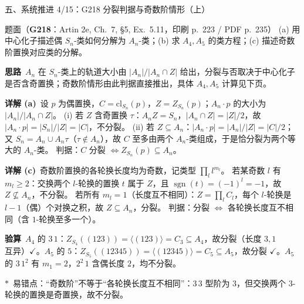 \documentclass[aspectratio=169,10pt,fontset=none]{ctexbeamer}
\newcommand{\ex}[1]{\textcolor{accent}{\footnotesize\bfseries #1}}
\newcommand{\key}[1]{\textcolor{ink}{\bfseries #1}}
\newcommand{\starpt}{\textcolor{accent}{\bfseries$\ast$}}
\begin{document}
\begin{frame}[t]{五、系统推进 4/15：G218 分裂判据与奇数阶情形（上）}
\label{ex:G218}
\scriptsize
\begin{block}{\footnotesize 题面（\ex{G218}：Artin 2e, Ch.~7, \S5, Ex.~5.11，印刷 p.~223 / PDF p.~235）}
(a) 用中心化子描述偶 $S_n$-类如何分解为 $A_n$-类；(b) 求 $A_4,A_5$ 的类方程；(c) 描述奇数阶置换对应类的分解。
\end{block}
\vspace{-1.0mm}
\key{思路}\ $A_n$ 在 $S_n$-类上的轨道大小由 $|A_n|/|A_n\cap Z|$ 给出，分裂与否取决于中心化子是否含奇置换；奇数阶情形由此判据直接推出，具体 $A_4,A_5$ 计算见下页。

\key{详解 (a)}\ 设 $p$ 为偶置换，$C=\mathrm{cl}_{S_n}(p)$，$Z=Z_{S_n}(p)$；$A_n\cdot p$ 的大小为 $|A_n|/|A_n\cap Z|$。
(i) 若 $Z$ 含奇置换 $\tau$：$A_nZ=S_n$，$|A_n\cap Z|=|Z|/2$，故 $|A_n\cdot p|=|S_n|/|Z|=|C|$，不分裂。
(ii) 若 $Z\subseteq A_n$：$|A_n\cdot p|=|A_n|/|Z|=|C|/2$；又 $S_n=A_n\cup A_n\tau$（$\tau\notin A_n$），故 $C$ 至多由两个 $A_n$-类组成，于是恰分裂为两个等大的 $A_n$-类。
判据：$C$ 分裂 $\iff Z_{S_n}(p)\subseteq A_n$。

\key{详解 (c)}\ 奇数阶置换的各轮换长度均为奇数，记类型 $\prod_l l^{m_l}$。
若某奇数 $l$ 有 $m_l\ge2$：交换两个 $l$-轮换的置换 $t$ 属于 $Z$，且 $\operatorname{sgn}(t)=(-1)^l=-1$，故 $Z\not\subseteq A_n$，不分裂。
若所有 $m_l=1$（长度互不相同）：$Z=\prod_l C_l$，每个 $l$-轮换是 $l-1$（偶）个对换之积，故 $Z\subseteq A_n$，分裂。
判据：分裂 $\iff$ 各轮换长度互不相同（含 $1$-轮换至多一个）。

\key{验算}\ $A_4$ 的 $3\,1$：$Z_{S_4}((123))=\langle(123)\rangle=C_3\subseteq A_4$，故分裂（长度 $3,1$ 互异）$\checkmark$。$A_5$ 的 $5$：$Z_{S_5}((12345))=\langle(12345)\rangle=C_5\subseteq A_5$，故分裂 $\checkmark$。$A_5$ 的 $3\,1^2$ 有 $m_1=2$，$2^2\,1$ 含偶长度 $2$，均不分裂。

\starpt\ 易错点：“奇数阶”不等于“各轮换长度互不相同”：$3\,3$ 型阶为 $3$，但交换两个 $3$-轮换的置换是奇置换，故不分裂。
\end{frame}
\end{document}
